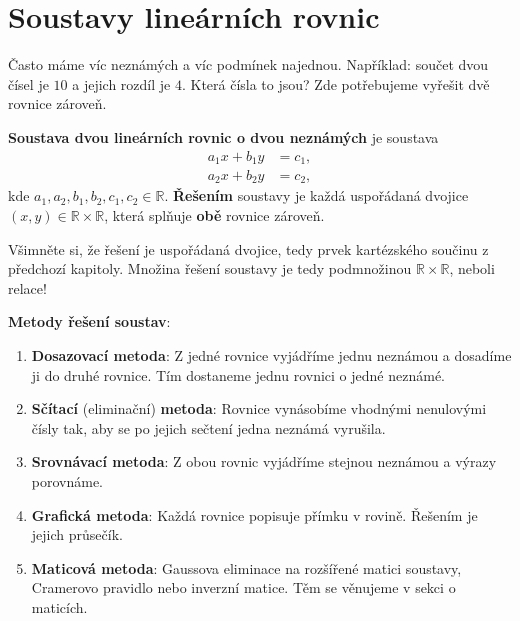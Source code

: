 \section{Soustavy lineárních rovnic}\label{sec:soustavy-linearnich}

Často máme víc neznámých a víc podmínek najednou. Například: součet dvou čísel je $10$ a jejich rozdíl je $4$. Která čísla to jsou? Zde potřebujeme vyřešit dvě rovnice zároveň.

\begin{definitionbox}
  \textbf{Soustava dvou lineárních rovnic o dvou neznámých} je soustava
  \begin{align*}
    a_1x + b_1y &= c_1,\\
    a_2x + b_2y &= c_2,
  \end{align*}
  kde $a_1, a_2, b_1, b_2, c_1, c_2\in\mathbb{R}$. \textbf{Řešením} soustavy je každá uspořádaná dvojice $(x, y)\in\mathbb{R}\times\mathbb{R}$, která splňuje \textbf{obě} rovnice zároveň.
\end{definitionbox}

Všimněte si, že řešení je uspořádaná dvojice, tedy prvek kartézského součinu z předchozí kapitoly. Množina řešení soustavy je tedy podmnožinou $\mathbb{R}\times\mathbb{R}$, neboli relace!

\begin{definitionbox}
  \textbf{Metody řešení soustav}:
  \begin{enumerate}
    \item \textbf{Dosazovací metoda}: Z jedné rovnice vyjádříme jednu neznámou a dosadíme ji do druhé rovnice. Tím dostaneme jednu rovnici o jedné neznámé.
    \item \textbf{Sčítací} (eliminační) \textbf{metoda}: Rovnice vynásobíme vhodnými nenulovými čísly tak, aby se po jejich sečtení jedna neznámá vyrušila.
    \item \textbf{Srovnávací metoda}: Z obou rovnic vyjádříme stejnou neznámou a výrazy porovnáme.
    \item \textbf{Grafická metoda}: Každá rovnice popisuje přímku v rovině. Řešením je jejich průsečík.
    \item \textbf{Maticová metoda}: Gaussova eliminace na rozšířené matici soustavy, Cramerovo pravidlo nebo inverzní matice. Těm se věnujeme v sekci o maticích.
  \end{enumerate}
\end{definitionbox}

